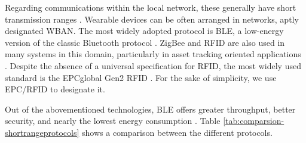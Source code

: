 Regarding communications within the local network, these generally have short transmission ranges \cite{Baker2017}. Wearable devices can be often arranged in networks, aptly designated \acf{WBAN}. The most widely adopted protocol is \acf{BLE}, a low-energy version of the classic Bluetooth protocol \cite{Doukas2012, Wu2019, Wu2020}. ZigBee and \acf{RFID} are also used in many systems in this domain, particularly in asset tracking oriented applications \cite{Fuhrer2006, Catarinucci2015, Adame2018}. Despite the absence of a universal specification for \acs{RFID}, the most widely used standard is the EPCglobal Gen2 RFID \cite{EPCglobal2006}. For the sake of simplicity, we use \acs{EPC/RFID} to designate it. \bigskip

Out of the abovementioned technologies, \acs{BLE} offers greater throughput, better security, and nearly the lowest energy consumption \cite{dementyev2013power}. Table \ref{tab:comparsion-shortrangeprotocols} shows a comparison between the different protocols.


